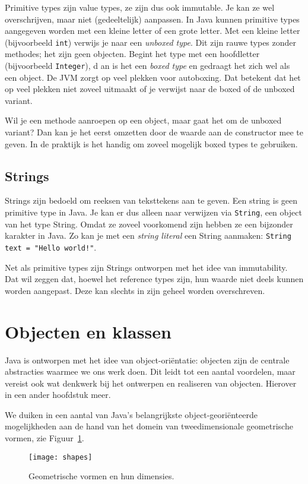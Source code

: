 \documentclass[dutch,a4paper,12pt,doubleside]{book}
\begin{document}
Primitive types zijn value types, ze zijn dus ook immutable. Je kan ze wel 
overschrijven, maar niet (gedeeltelijk) aanpassen. 
In Java kunnen primitive types aangegeven worden met een kleine letter of een 
grote letter. Met een kleine letter (bijvoorbeeld \texttt{int}) 
verwijs je naar een \textit{unboxed type}. 
Dit zijn rauwe types zonder methodes; het zijn geen objecten.
Begint het type met een hoofdletter (bijvoorbeeld \texttt{Integer}), d
an is het een \textit{boxed type} en 
gedraagt het zich wel als een object. De JVM zorgt op veel plekken voor 
autoboxing. Dat betekent dat het op veel plekken niet zoveel uitmaakt of je 
verwijst naar de boxed of de unboxed variant. 

Wil je een methode aanroepen op 
een object, maar gaat het om de unboxed variant? Dan kan je het eerst omzetten 
door de waarde aan de constructor mee te geven. In de praktijk is het handig om 
zoveel mogelijk boxed types te gebruiken.

\subsection{Strings}
Strings zijn bedoeld om reeksen van teksttekens aan te geven.
Een string is geen primitive type in Java. Je kan er dus alleen 
naar verwijzen via \texttt{String}, een object van het type String. 
Omdat ze zoveel voorkomend zijn hebben ze een bijzonder karakter in Java. 
Zo kan je met een \textit{string literal} een String aanmaken:
\texttt{String text = "Hello world!"}. 

Net als primitive types zijn Strings ontworpen met het idee van 
immutability. Dat wil zeggen dat, hoewel het reference types zijn, hun waarde 
niet deels kunnen worden aangepast. Deze kan slechts in zijn geheel worden 
overschreven.

\section{Objecten en klassen}
Java is ontworpen met het idee van object-oriëntatie:
objecten zijn de centrale abstracties waarmee we ons werk doen.
Dit leidt tot een aantal voordelen, maar vereist ook wat denkwerk
bij het ontwerpen en realiseren van objecten. Hierover in een ander hoofdstuk meer.

We duiken in een aantal van Java's belangrijkste object-georiënteerde mogelijkheden
aan de hand van het domein van tweedimensionale geometrische vormen, zie Figuur~\ref{fig:shapes}.
\begin{figure}[H]
    \centering
    \texttt{[image: shapes]}
    \caption{Geometrische vormen en hun dimensies.}
    \label{fig:shapes}
\end{figure}
\end{document}
